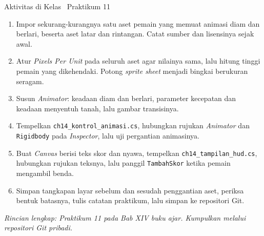 \documentclass[aspectratio=169,10pt]{beamer}
\begin{document}
\begin{frame}{Aktivitas di Kelas \textperiodcentered\ Praktikum 11}
\begin{enumerate}
  \item Impor sekurang-kurangnya satu aset pemain yang memuat animasi diam dan
        berlari, beserta aset latar dan rintangan. Catat sumber dan lisensinya
        sejak awal.
  \item Atur \emph{Pixels Per Unit} pada seluruh aset agar nilainya sama, lalu
        hitung tinggi pemain yang dikehendaki. Potong \emph{sprite sheet} menjadi
        bingkai berukuran seragam.
  \item Susun \emph{Animator}: keadaan diam dan berlari, parameter kecepatan dan
        keadaan menyentuh tanah, lalu gambar transisinya.
  \item Tempelkan \texttt{ch14\_kontrol\_animasi.cs}, hubungkan rujukan
        \emph{Animator} dan \texttt{Rigidbody} pada \emph{Inspector}, lalu uji
        pergantian animasinya.
  \item Buat \emph{Canvas} berisi teks skor dan nyawa, tempelkan
        \texttt{ch14\_tampilan\_hud.cs}, hubungkan rujukan teksnya, lalu panggil
        \texttt{TambahSkor} ketika pemain mengambil benda.
  \item Simpan tangkapan layar sebelum dan sesudah penggantian aset, periksa
        bentuk batasnya, tulis catatan praktikum, lalu simpan ke repositori Git.
\end{enumerate}
\vspace{0.06cm}
{\footnotesize\color{ubAccent}\itshape Rincian lengkap: Praktikum 11 pada
Bab XIV buku ajar. Kumpulkan melalui repositori Git pribadi.}
\end{frame}
\end{document}

